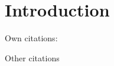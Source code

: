 \section{Introduction}\label{intro_paper2}
Own citations:~\cite{pub1Key,pub2Key,pub3Key,pub4Key,pub5Key,pub6Key,pub7Key}

Other citations \cite{modric2022midfield,neymar2018roll,worldcupdata2030}

\lipsum[1-2]
